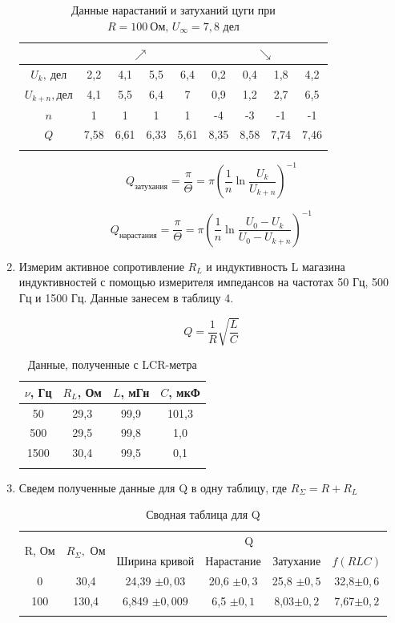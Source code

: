 \documentclass[a4paper, 12pt]{article}%
\begin{document}
\begin{enumerate}
		
		\begin{longtable}{|c|c|c|c|c|c|c|c|c|}  \hline
			{} & \multicolumn{4}{|c|}{$\nearrow$} & \multicolumn{4}{|c|}{$\searrow$} \\\hline
			$U_k,\ \text{дел}$ & 2,2 & 4,1 & 5,5 & 6,4 & 0,2 & 0,4 & 1,8 & 4,2 \\\hline
			$U_{k+n}, \text{дел}$ & 4,1 & 5,5 & 6,4 & 7 & 0,9 & 1,2 & 2,7 & 6,5 \\\hline
			$n$ & 1 & 1 & 1 & 1 & -4 & -3 & -1 & -1 \\\hline
			$Q$ & 7,58 & 6,61 & 6,33 & 5,61 & 8,35 & 8,58 & 7,74 & 7,46 \\\hline
			\caption{Данные нарастаний и затуханий цуги при $R = 100\ \text{Ом, } U_{\infty} = 7,8$ дел}
		\end{longtable}
		
		$$  Q_{\text{затухания}} = \frac{\pi}{\Theta} = \pi (\frac{1}{n} \ln \frac{U_k}{U_{k+n}})^{-1}  $$
		
		$$ Q_{\text{нарастания}} = \frac{\pi}{\Theta} =  \pi (\frac{1}{n} \ln \frac{U_0 - U_k}{U_0 - U_{k+n}})^{-1}  $$
		
		\item Измерим активное сопротивление $R_L$ и индуктивность L магазина
		индуктивностей с помощью измерителя импедансов на частотах 50 Гц, 500 Гц и 1500 Гц. Данные занесем в таблицу 4.
		
		$$ Q = \frac{1}{R}\sqrt{\frac{L}{C}} $$
		
		\begin{longtable} {|c|c|c|c|}
			\hline
			 $\nu$, Гц &  $R_L$, Ом & $L$, мГн & $C$, мкФ \\ \hline
			50 & 29,3 & 99,9 & 101,3 \\ \hline
			500 & 29,5 & 99,8 & 1,0 \\ \hline
			1500 & 30,4 & 99,5 & 0,1 \\ \hline
			\caption{Данные, полученные с LCR-метра}
		\end{longtable}
		
	\item Сведем полученные данные для Q в одну таблицу, где $R_{\Sigma} = R + R_L$
	
		\begin{longtable} {|c|c|c|c|c|c|}
		\hline
		\multirow{2}{*}{R, Ом} & 	\multirow{2}{*}{$R_{\Sigma}, $ Ом} & \multicolumn{4}{|c|}{Q} \\ \cline{3-6}
		& & Ширина кривой & Нарастание & Затухание & $f(RLC)$ \\\hline
		
		0 & 30,4 & 24,39 $\pm 0,03$ & 20,6 $\pm 0,3$& 25,8 $\pm 0,5$& 32,8$\pm 0,6$ \\\hline
		100 & 130,4 & 6,849 $\pm 0,009$ & 6,5 $\pm 0,1$& 8,03$\pm 0,2$ & 7,67$\pm 0,2$\\\hline
		
		\caption{Сводная таблица для Q}
		\end{longtable}
		
		
	\end{enumerate}
	
\end{document}
